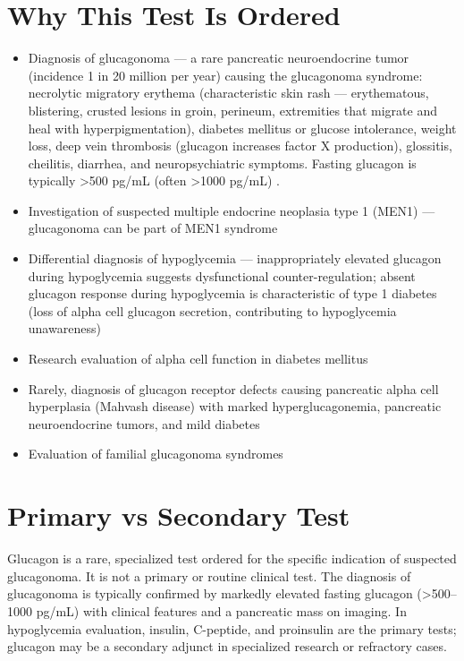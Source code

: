 \section*{Why This Test Is Ordered}
\begin{itemize}
  \item Diagnosis of glucagonoma --- a rare pancreatic neuroendocrine tumor (incidence 1 in 20 million per year) causing the glucagonoma syndrome: necrolytic migratory erythema (characteristic skin rash --- erythematous, blistering, crusted lesions in groin, perineum, extremities that migrate and heal with hyperpigmentation), diabetes mellitus or glucose intolerance, weight loss, deep vein thrombosis (glucagon increases factor X production), glossitis, cheilitis, diarrhea, and neuropsychiatric symptoms. Fasting glucagon is typically >500 pg/mL (often >1000 pg/mL) \cite{wermers1996glucagonoma}.
  \item Investigation of suspected multiple endocrine neoplasia type 1 (MEN1) --- glucagonoma can be part of MEN1 syndrome
  \item Differential diagnosis of hypoglycemia --- inappropriately elevated glucagon during hypoglycemia suggests dysfunctional counter-regulation; absent glucagon response during hypoglycemia is characteristic of type 1 diabetes (loss of alpha cell glucagon secretion, contributing to hypoglycemia unawareness)
  \item Research evaluation of alpha cell function in diabetes mellitus
  \item Rarely, diagnosis of glucagon receptor defects causing pancreatic alpha cell hyperplasia (Mahvash disease) with marked hyperglucagonemia, pancreatic neuroendocrine tumors, and mild diabetes
  \item Evaluation of familial glucagonoma syndromes
\end{itemize}

\section*{Primary vs Secondary Test}
Glucagon is a rare, specialized test ordered for the specific indication of suspected glucagonoma. It is not a primary or routine clinical test. The diagnosis of glucagonoma is typically confirmed by markedly elevated fasting glucagon (>500--1000 pg/mL) with clinical features and a pancreatic mass on imaging. In hypoglycemia evaluation, insulin, C-peptide, and proinsulin are the primary tests; glucagon may be a secondary adjunct in specialized research or refractory cases.

